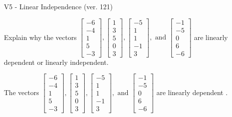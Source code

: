 \begin{exercise}
  \begin{exerciseTitle}V5 - Linear Independence (ver. 121)\end{exerciseTitle}
  \begin{exerciseStatement}
    Explain why the vectors \(\left[\begin{array}{r}
-6 \\
-4 \\
1 \\
5 \\
-3
\end{array}\right] , \left[\begin{array}{r}
1 \\
3 \\
5 \\
0 \\
3
\end{array}\right] , \left[\begin{array}{r}
-5 \\
1 \\
1 \\
-1 \\
3
\end{array}\right] , \text{ and } \left[\begin{array}{r}
-1 \\
-5 \\
0 \\
6 \\
-6
\end{array}\right]\) are linearly dependent or linearly independent.	


  \end{exerciseStatement}
  \begin{exerciseAnswer}
   The vectors \(\left[\begin{array}{r}
-6 \\
-4 \\
1 \\
5 \\
-3
\end{array}\right] , \left[\begin{array}{r}
1 \\
3 \\
5 \\
0 \\
3
\end{array}\right] , \left[\begin{array}{r}
-5 \\
1 \\
1 \\
-1 \\
3
\end{array}\right] , \text{ and } \left[\begin{array}{r}
-1 \\
-5 \\
0 \\
6 \\
-6
\end{array}\right]\) are 
  	 linearly dependent  .
  


  \end{exerciseAnswer}
\end{exercise}